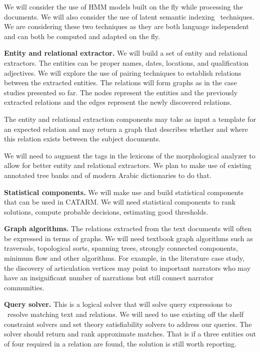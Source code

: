 \documentclass[12pt]{article}
\begin{document}
{We will consider the use of HMM models 
built on the fly while processing the documents.
We will also consider the use of
latent semantic indexing~\cite{LSI89} techniques. 
We are considering these two techniques as they are 
both language independent and can both be computed and
adapted on the fly.

{\bf Entity and relational extractor.}
We will build a set of entity and relational extractors. 
The entities can be proper names, dates, locations,
and qualification adjectives. 
We will explore the use of pairing techniques to establish 
relations between the extracted entities.
The relations will form graphs as in the case studies presented
so far. The nodes represent the entities and the previously 
extracted relations and the edges represent the newly discovered 
relations.

The entity and relational extraction components 
may take as input a template for an expected relation and 
may return a graph that describes whether and where 
this relation exists between the subject documents.

We will need to augment the tags in the lexicons of the 
morphological analyzer to allow for better entity and relational
extractors. 
We plan to make use of existing annotated tree banks and of
modern Arabic dictionaries to do that. 

{\bf Statistical components.}
We will make use and build statistical components that can be used
in CATARM. 
We will need statistical components to rank solutions, compute 
probable decisions, estimating good thresholds. 

{\bf Graph algorithms.}
The relations extracted from the text documents will often 
be expressed in terms of graphs.
We will need textbook graph algorithms such as traversals, 
topological sorts, spanning trees, strongly connected 
components, minimum flow  and other algorithms.
For example, in the literature case study, the discovery
of articulation vertices may point to important narrators 
who may have an insignificant number of narrations 
but still connect narrator communities.

{\bf Query solver.}
This is a logical solver that will solve query expressions to \
resolve matching text and relations.
We will need to use existing off the shelf constraint solvers 
and set theory satisfiability solvers to address our queries. 
The solver should return and rank approximate matches.
That is if a three entities out of four required in a relation are
found, the solution is still worth reporting. 

}
\end{document}
